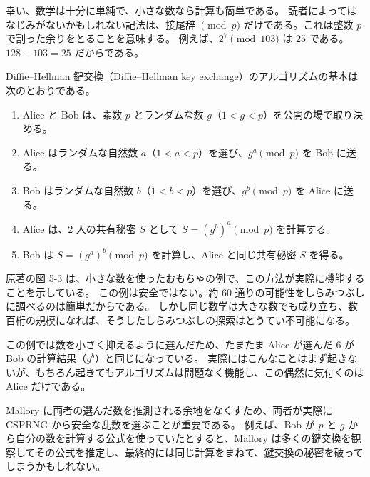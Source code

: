 \documentclass[uplatex]{jsarticle}
\def\label#1{}%
\begin{document}
幸い、数学は十分に単純で、小さな数なら計算も簡単である。
読者によってはなじみがないかもしれない記法は、接尾辞 $\pmod{p}$ だけである。これは整数 $p$ で割った余りをとることを意味する。
例えば、$2^7 \pmod{103}$ は $25$ である。$128 - 103 = 25$ だからである。

\begin{dfn}\label{dfn:ch5-diffie-hellman}
\underline{Diffie--Hellman 鍵交換}（Diffie--Hellman key exchange）のアルゴリズムの基本は次のとおりである。
\begin{enumerate}
\item Alice と Bob は、素数 $p$ とランダムな数 $g$（$1<g<p$）を公開の場で取り決める。
\item Alice はランダムな自然数 $a$（$1<a<p$）を選び、$g^a \pmod{p}$ を Bob に送る。
\item Bob はランダムな自然数 $b$（$1<b<p$）を選び、$g^b \pmod{p}$ を Alice に送る。
\item Alice は、2 人の共有秘密 $S$ として $S = (g^b)^a \pmod{p}$ を計算する。
\item Bob は $S = (g^a)^b \pmod{p}$ を計算し、Alice と同じ共有秘密 $S$ を得る。
\end{enumerate}
\end{dfn}

\begin{exa}[小さな数による鍵交換]\label{exa:ch5-toy-key-exchange}
原著の図 5-3 は、小さな数を使ったおもちゃの例で、この方法が実際に機能することを示している。
この例は安全ではない。約 60 通りの可能性をしらみつぶしに調べるのは簡単だからである。
しかし同じ数学は大きな数でも成り立ち、数百桁の規模になれば、そうしたしらみつぶしの探索はとうてい不可能になる。

この例では数を小さく抑えるように選んだため、たまたま Alice が選んだ 6 が Bob の計算結果（$g^b$）と同じになっている。
実際にはこんなことはまず起きないが、もちろん起きてもアルゴリズムは問題なく機能し、この偶然に気付くのは Alice だけである。
\end{exa}

\begin{rem}[鍵交換における乱数]\label{rem:ch5-key-exchange-randomness}
Mallory に両者の選んだ数を推測される余地をなくすため、両者が実際に CSPRNG から安全な乱数を選ぶことが重要である。
例えば、Bob が $p$ と $g$ から自分の数を計算する公式を使っていたとすると、Mallory は多くの鍵交換を観察してその公式を推定し、最終的には同じ計算をまねて、鍵交換の秘密を破ってしまうかもしれない。
\end{rem}
\end{document}
